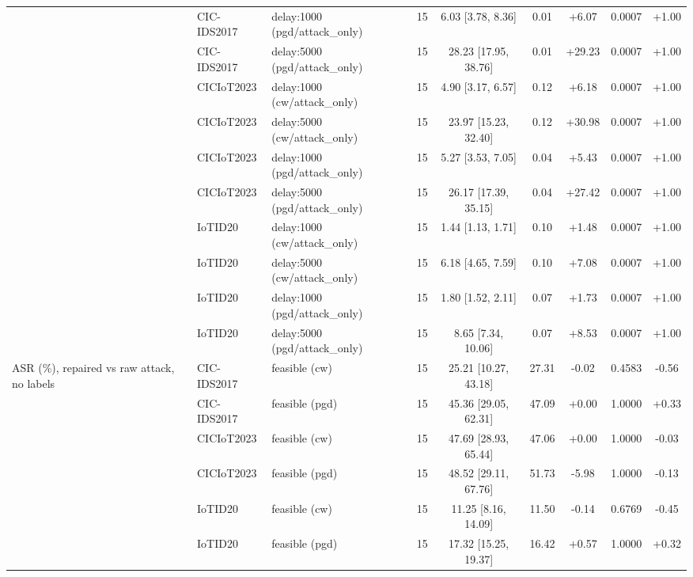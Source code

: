 \begin{table}[t]
\begin{tabular}{lllcccccc}
 & CIC-IDS2017 & delay:1000 (pgd/attack\_only) & 15 & 6.03 [3.78, 8.36] & 0.01 & +6.07 & 0.0007 & +1.00 \\
 & CIC-IDS2017 & delay:5000 (pgd/attack\_only) & 15 & 28.23 [17.95, 38.76] & 0.01 & +29.23 & 0.0007 & +1.00 \\
 & CICIoT2023 & delay:1000 (cw/attack\_only) & 15 & 4.90 [3.17, 6.57] & 0.12 & +6.18 & 0.0007 & +1.00 \\
 & CICIoT2023 & delay:5000 (cw/attack\_only) & 15 & 23.97 [15.23, 32.40] & 0.12 & +30.98 & 0.0007 & +1.00 \\
 & CICIoT2023 & delay:1000 (pgd/attack\_only) & 15 & 5.27 [3.53, 7.05] & 0.04 & +5.43 & 0.0007 & +1.00 \\
 & CICIoT2023 & delay:5000 (pgd/attack\_only) & 15 & 26.17 [17.39, 35.15] & 0.04 & +27.42 & 0.0007 & +1.00 \\
 & IoTID20 & delay:1000 (cw/attack\_only) & 15 & 1.44 [1.13, 1.71] & 0.10 & +1.48 & 0.0007 & +1.00 \\
 & IoTID20 & delay:5000 (cw/attack\_only) & 15 & 6.18 [4.65, 7.59] & 0.10 & +7.08 & 0.0007 & +1.00 \\
 & IoTID20 & delay:1000 (pgd/attack\_only) & 15 & 1.80 [1.52, 2.11] & 0.07 & +1.73 & 0.0007 & +1.00 \\
 & IoTID20 & delay:5000 (pgd/attack\_only) & 15 & 8.65 [7.34, 10.06] & 0.07 & +8.53 & 0.0007 & +1.00 \\
ASR (\%), repaired vs raw attack, no labels & CIC-IDS2017 & feasible (cw) & 15 & 25.21 [10.27, 43.18] & 27.31 & -0.02 & 0.4583 & -0.56 \\
 & CIC-IDS2017 & feasible (pgd) & 15 & 45.36 [29.05, 62.31] & 47.09 & +0.00 & 1.0000 & +0.33 \\
 & CICIoT2023 & feasible (cw) & 15 & 47.69 [28.93, 65.44] & 47.06 & +0.00 & 1.0000 & -0.03 \\
 & CICIoT2023 & feasible (pgd) & 15 & 48.52 [29.11, 67.76] & 51.73 & -5.98 & 1.0000 & -0.13 \\
 & IoTID20 & feasible (cw) & 15 & 11.25 [8.16, 14.09] & 11.50 & -0.14 & 0.6769 & -0.45 \\
 & IoTID20 & feasible (pgd) & 15 & 17.32 [15.25, 19.37] & 16.42 & +0.57 & 1.0000 & +0.32 \\
\bottomrule
\end{tabular}
\end{table}
